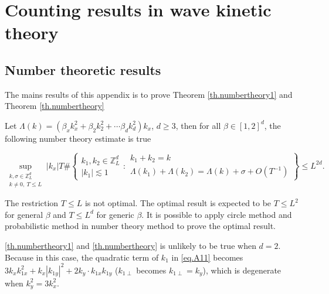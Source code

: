 \chapter{Counting results in wave kinetic theory}\label{chapter.numbertheory}


\section{Number theoretic results}\label{sec.numbertheoryA}
The mains results of this appendix is to prove Theorem \ref{th.numbertheory1} and Theorem \ref{th.numbertheory} 

\begin{thm}\label{th.numbertheory1}
Let $\Lambda(k)=(\beta_x k_x^2+\beta_2 k_2^2+\cdots\beta_d k_d^2)k_x$, $d\ge 3$, then for all $\beta\in [1,2]^d$, the following number theory estimate is true

\begin{equation}\label{eq.numbertheory1}
    \sup_{\substack{k,\sigma\in\mathbb{Z}_L^d\\k\ne 0,\ T\le L}} |k_x|T\#\left
    \{\begin{matrix}
k_1,k_2\in\mathbb{Z}_L^d \\
|k_1|\lesssim 1
\end{matrix}
:
\begin{matrix}
k_1+k_2=k \\
\Lambda(k_1)+\Lambda(k_2)=\Lambda(k)+\sigma+O(T^{-1})
\end{matrix}
\right\}\le L^{2d}.
\end{equation}


\end{thm}

\begin{rem}
The restriction $T\le L$ is not optimal. The optimal result is expected to be $T\le L^2$ for general $\beta$ and $T\le L^{d}$ for generic $\beta$. It is possible to apply circle method and probabilistic method in number theory method to prove the optimal result.
\end{rem}

\begin{rem}\label{rem.nottrue2d}
\ref{th.numbertheory1} and \ref{th.numbertheory} is unlikely to be true when $d=2$. Because in this case, the quadratic term of $k_1$ in \eqref{eq.A11} becomes $3k_xk_{1x}^2+k_x|k_{1y}|^2+2k_{y}\cdot k_{1x} k_{1y}$ ($k_{1\perp}$ becomes $k_{1\perp}=k_y$), which is degenerate when $k_{y}^2=3k_x^2$. 
\end{rem}

